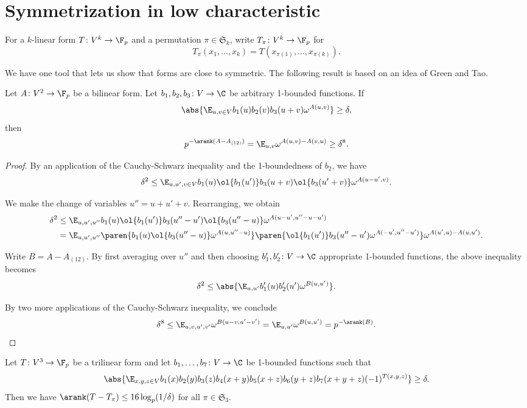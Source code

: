 \section{Symmetrization in low characteristic}
\label{sec:symmetrization}

For a $k$-linear form $T\colon V^k\to \F_p$ and a permutation $\pi\in\mathfrak S_k$, write $T_\pi\colon V^k\to\F_p$ for \[T_\pi(x_1,\ldots, x_k)=T(x_{\pi(1)},\ldots,x_{\pi(k)}).\]

We have one tool that lets us show that forms are close to symmetric. The following result is based on an idea of Green and Tao.

\begin{lemma}
\label{thm:gt-sym}
Let $A\colon V^2\to\F_p$ be a bilinear form. Let $b_1,b_2,b_3\colon V\to\C$ be arbitrary 1-bounded functions. If\[\abs{\E_{u,v\in V}b_1(u)b_2(v)b_3(u+v)\omega^{A(u,v)}}\geq\delta,\]then\[p^{-\arank(A-A_{(12)})}=\E_{u,v}\omega^{A(u,v)-A(v,u)}\geq\delta^8.\]
\end{lemma}

\begin{proof}
By an application of the Cauchy-Schwarz inequality and the 1-boundedness of $b_2$, we have
\[\delta^2\leq\E_{u,u',v\in V}b_1(u)\ol{b_1(u')}b_3(u+v)\ol{b_3(u'+v)}\omega^{A(u-u',v)}.\]

We make the change of variables $u''=u+u'+v$. Rearranging, we obtain
\begin{align*}
\delta^2
&\leq\E_{u,u',u''}b_1(u)\ol{b_1(u')}b_3(u''-u')\ol{b_3(u''-u)}\omega^{A(u-u',u''-u-u')}\\
&=\E_{u,u',u''}\paren{b_1(u)\ol{b_3(u''-u)}\omega^{A(u,u''-u)}}\paren{\ol{b_1(u')}b_3(u''-u')\omega^{A(-u',u''-u')}}\omega^{A(u',u)-A(u,u')}.
\end{align*}

Write $B=A-A_{(12)}$. By first averaging over $u''$ and then choosing $b_1',b_2'\colon V\to\C$ appropriate 1-bounded functions, the above inequality becomes
\[\delta^2\leq\abs{\E_{u,u'}b_1'(u)b_2'(u')\omega^{B(u,u')}}.\]

By two more applications of the Cauchy-Schwarz inequality, we conclude
\[\delta^8\leq\E_{u,v,u',v'}\omega^{B(u-v,u'-v')}=\E_{u,u'}\omega^{B(u,u')}=p^{-\arank(B)}.\qedhere\]
\end{proof}

\begin{cor}
\label{thm:gt-symmetry-cor}
Let $T\colon V^3\to\F_p$ be a trilinear form and let $b_1,\ldots,b_7\colon V\to\C$ be 1-bounded functions such that
\[\abs{\E_{x,y,z\in V}b_1(x)b_2(y)b_3(z)b_4(x+y)b_5(x+z)b_6(y+z)b_7(x+y+z)(-1)^{T(x,y,z)}}\geq\delta.\]
Then we have $\arank(T-T_\pi)\leq16\log_p(1/\delta)$ for all $\pi\in\mathfrak S_3$.
\end{cor}


